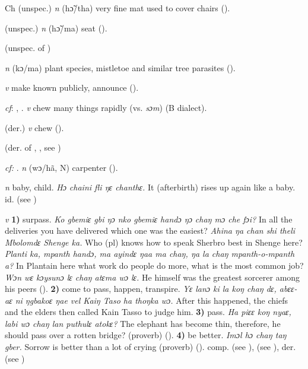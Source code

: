 \begin{letter}{Ch}
 (unspec.) \textit{n} (hɔ̃/tha) very fine mat used to cover chairs (\citealt{Pichl1967}). 

 (unspec.) \textit{n} (hɔ̃/ma) seat (\citealt{Pichl1967}). 

 (unspec. of ) 

 \textit{n} (kɔ/ma) plant species, mistletoe and similar tree parasites (\citealt{Pichl1967}). 

 \textit{v} make known publicly, announce (\citealt{Pichl1967}).

 \textit{cf}: , . \textit{v} chew many things rapidly (vs. \textit{sɔm}) (B dialect). 

 (der.) \textit{v} chew (\citealt{Sumner1921}). 

 (der. of , , see ) 

 \textit{cf:} . \textit{n} (wɔ/hã, N) carpenter (\citealt{Pichl1967}). 

 \textit{n} baby, child. \textit{Hɔ chaini fli ŋɛ chanthɛ.} It (afterbirth) rises up again like a baby. id.  (see ) 

 \textit{v} \textbf{1)} surpass. \textit{Ko gbemiɛ gbi ŋɔ nko gbemiɛ handɔ ŋɔ chaŋ mɔ che fɔi?} In all the deliveries you have delivered which one was the easiest? \textit{Ahina ŋa chan shi theli Mbolomdɛ Shenge ka.} Who (pl) knows how to speak Sherbro best in Shenge here? \textit{Planti ka, mpanth handɔ, ma ayindɛ ŋaa ma chaŋ, ŋa la chaŋ mpanth-o-mpanth a?} In Plantain here what work do people do more, what is the most common job? \textit{Wɔn wɛ kɔysunɔ lɛ chaŋ atɛma wɔ lɛ.} He himself was the greatest sorcerer among his peers (\citealt{Pichl1967}). \textbf{2)} come to pass, happen, transpire. \textit{Yɛ lanɔ ki la koŋ chaŋ dɛ, abɛɛ-aɛ ni ŋgbakoɛ ŋae vel Kaiŋ Taso ha thoŋka wɔ.} After this happened, the chiefs and the elders then called Kain Tasso to judge him. \textbf{3)} pass. \textit{Ha piɛɛ koŋ nyaɛ, labi wɔ chaŋ lan puthulɛ atokɛ?} The elephant has become thin, therefore, he should pass over a rotten bridge? (proverb) (\citealt{TISLL1979}). \textbf{4)} be better. \textit{Imɔl hɔ chaŋ taŋ gber.} Sorrow is better than a lot of crying (proverb) (\citealt{TISLL1979}). comp.  (see ),  (see ), der.  (see )


\end{letter}
